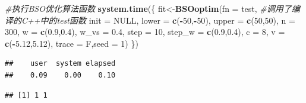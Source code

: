 \documentclass[]{ctexbook}
\newenvironment{Shaded}{\begin{snugshade}}{\end{snugshade}}
\newcommand{\KeywordTok}[1]{\textcolor[rgb]{0.13,0.29,0.53}{\textbf{#1}}}
\newcommand{\DataTypeTok}[1]{\textcolor[rgb]{0.13,0.29,0.53}{#1}}
\newcommand{\DecValTok}[1]{\textcolor[rgb]{0.00,0.00,0.81}{#1}}
\newcommand{\FloatTok}[1]{\textcolor[rgb]{0.00,0.00,0.81}{#1}}
\newcommand{\CommentTok}[1]{\textcolor[rgb]{0.56,0.35,0.01}{\textit{#1}}}
\newcommand{\OtherTok}[1]{\textcolor[rgb]{0.56,0.35,0.01}{#1}}
\newcommand{\OperatorTok}[1]{\textcolor[rgb]{0.81,0.36,0.00}{\textbf{#1}}}
\newcommand{\NormalTok}[1]{#1}
\theoremstyle{definition}
\theoremstyle{definition}
\theoremstyle{definition}
\theoremstyle{remark}
\begin{document}
\begin{Shaded}
\begin{Highlighting}[]
\CommentTok{#执行BSO优化算法函数}
\KeywordTok{system.time}\NormalTok{(\{}
\NormalTok{  fit<-}\KeywordTok{BSOoptim}\NormalTok{(}\DataTypeTok{fn =}\NormalTok{ test, }\CommentTok{#调用了编译的C++中的test函数}
                \DataTypeTok{init =} \OtherTok{NULL}\NormalTok{,}
                \DataTypeTok{lower =} \KeywordTok{c}\NormalTok{(}\OperatorTok{-}\DecValTok{50}\NormalTok{,}\OperatorTok{-}\DecValTok{50}\NormalTok{),}
                \DataTypeTok{upper =} \KeywordTok{c}\NormalTok{(}\DecValTok{50}\NormalTok{,}\DecValTok{50}\NormalTok{),}
                \DataTypeTok{n =} \DecValTok{300}\NormalTok{,}
                \DataTypeTok{w =} \KeywordTok{c}\NormalTok{(}\FloatTok{0.9}\NormalTok{,}\FloatTok{0.4}\NormalTok{),}
                \DataTypeTok{w_vs =} \FloatTok{0.4}\NormalTok{, }
                \DataTypeTok{step =} \DecValTok{10}\NormalTok{,}
                \DataTypeTok{step_w =} \KeywordTok{c}\NormalTok{(}\FloatTok{0.9}\NormalTok{,}\FloatTok{0.4}\NormalTok{),}
                \DataTypeTok{c =} \DecValTok{8}\NormalTok{,}
                \DataTypeTok{v =} \KeywordTok{c}\NormalTok{(}\OperatorTok{-}\FloatTok{5.12}\NormalTok{,}\FloatTok{5.12}\NormalTok{),}
                \DataTypeTok{trace =}\NormalTok{ F,}\DataTypeTok{seed =} \DecValTok{1}\NormalTok{)}
\NormalTok{\})}
\end{Highlighting}
\end{Shaded}

\begin{verbatim}
##    user  system elapsed 
##    0.09    0.00    0.10
\end{verbatim}

\begin{Shaded}
\end{Shaded}

\begin{verbatim}
## [1] 1 1
\end{verbatim}

\begin{Shaded}
\end{Shaded}
\end{document}
